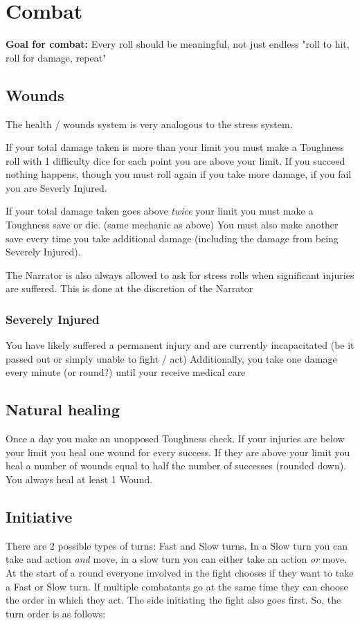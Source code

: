 \chapter{Combat}

\textbf{Goal for combat:} Every roll should be meaningful, not just endless "roll to hit, roll for damage, repeat" 

\section{Wounds}
The health / wounds system is very analogous to the stress system.

If your total damage taken is more than your limit you must make a Toughness roll with 1 difficulty dice for each point you are above your limit.  
If you succeed nothing happens, though you must roll again if you take more damage, if you fail you are Severly Injured.

If your total damage taken goes above \textit{twice} your limit you must make a Toughness save or die. (same mechanic as above)  
You must also make another save every time you take additional damage (including the damage from being Severely Injured).

The Narrator is also always allowed to ask for stress rolls when significant injuries are suffered. This is done at the discretion of the Narrator


\subsection{Severely Injured}
You have likely suffered a permanent injury and are currently incapacitated (be it passed out or simply unable to fight / act)
Additionally, you take one damage every minute (or round?) until your receive medical care


\section{Natural healing}
Once a day you make an unopposed Toughness check. 
If your injuries are below your limit you heal one wound for every success. 
If they are above your limit you heal a number of wounds equal to half the number of successes (rounded down).
You always heal at least 1 Wound.

\section{Initiative}
There are 2 possible types of turns: Fast and Slow turns.  
In a Slow turn you can take and action \textit{and} move, in a slow turn you can either take an action \textit{or} move.  
At the start of a round everyone involved in the fight chooses if they want to take a Fast or Slow turn.
If multiple combatants go at the same time they can choose the order in which they act.
The side initiating the fight also goes first. So, the turn order is as follows: 

